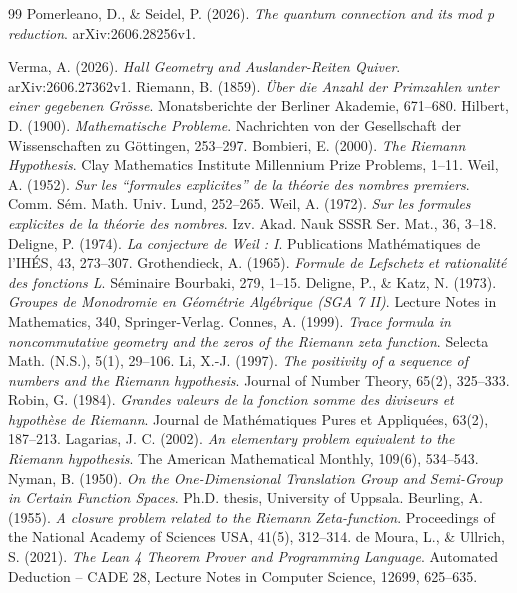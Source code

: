 \documentclass[11pt,a4paper]{article}
\theoremstyle{definition}
\begin{document}
\begin{thebibliography}{99}
 Pomerleano, D., \& Seidel, P. (2026). \textit{The quantum connection and its mod p reduction}. arXiv:2606.28256v1.

 Verma, A. (2026). \textit{Hall Geometry and Auslander-Reiten Quiver}. arXiv:2606.27362v1.
 Riemann, B. (1859). \textit{Über die Anzahl der Primzahlen unter einer gegebenen Grösse}. Monatsberichte der Berliner Akademie, 671--680.
 Hilbert, D. (1900). \textit{Mathematische Probleme}. Nachrichten von der Gesellschaft der Wissenschaften zu Göttingen, 253--297.
 Bombieri, E. (2000). \textit{The Riemann Hypothesis}. Clay Mathematics Institute Millennium Prize Problems, 1--11.
 Weil, A. (1952). \textit{Sur les ``formules explicites'' de la théorie des nombres premiers}. Comm. Sém. Math. Univ. Lund, 252--265.
 Weil, A. (1972). \textit{Sur les formules explicites de la théorie des nombres}. Izv. Akad. Nauk SSSR Ser. Mat., 36, 3--18.
 Deligne, P. (1974). \textit{La conjecture de Weil : I}. Publications Mathématiques de l'IHÉS, 43, 273--307.
 Grothendieck, A. (1965). \textit{Formule de Lefschetz et rationalité des fonctions L}. Séminaire Bourbaki, 279, 1--15.
 Deligne, P., \& Katz, N. (1973). \textit{Groupes de Monodromie en Géométrie Algébrique (SGA 7 II)}. Lecture Notes in Mathematics, 340, Springer-Verlag.
 Connes, A. (1999). \textit{Trace formula in noncommutative geometry and the zeros of the Riemann zeta function}. Selecta Math. (N.S.), 5(1), 29--106.
 Li, X.-J. (1997). \textit{The positivity of a sequence of numbers and the Riemann hypothesis}. Journal of Number Theory, 65(2), 325--333.
 Robin, G. (1984). \textit{Grandes valeurs de la fonction somme des diviseurs et hypothèse de Riemann}. Journal de Mathématiques Pures et Appliquées, 63(2), 187--213.
 Lagarias, J. C. (2002). \textit{An elementary problem equivalent to the Riemann hypothesis}. The American Mathematical Monthly, 109(6), 534--543.
 Nyman, B. (1950). \textit{On the One-Dimensional Translation Group and Semi-Group in Certain Function Spaces}. Ph.D. thesis, University of Uppsala.
 Beurling, A. (1955). \textit{A closure problem related to the Riemann Zeta-function}. Proceedings of the National Academy of Sciences USA, 41(5), 312--314.
 de Moura, L., \& Ullrich, S. (2021). \textit{The Lean 4 Theorem Prover and Programming Language}. Automated Deduction -- CADE 28, Lecture Notes in Computer Science, 12699, 625--635.
\end{thebibliography}
\end{document}
